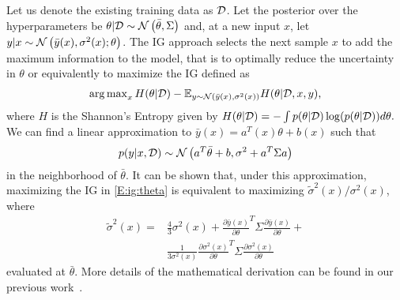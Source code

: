 Let us denote the existing training data as \(\mathcal{D}\).
Let the posterior over the hyperparameters be \(\theta|\mathcal{D} \sim \operatorname*{\mathcal{N}}\left(\bar{\theta}, \Sigma\right)\) and, at a new input $x$, let \(y|x \sim \operatorname*{\mathcal{N}}\left(\bar{y}(x), \sigma^2(x);\theta\right)\).
The IG approach selects the next sample $x$ to add the maximum information to the model, that is to optimally reduce the uncertainty in $\theta$ or equivalently to maximize the IG defined as
\begin{align}
\textstyle\operatorname*{arg\,max}_x H(\theta|\mathcal{D}) - \mathbb{E}_{y \sim \operatorname*{\mathcal{N}}\left(\bar{y}(x), \sigma^2(x)\right)}H(\theta|\mathcal{D},x,y)\text,
\label{E:ig:theta}
\end{align}
where \(H\) is the Shannon's Entropy given by
\begin{math}
H(\theta|\mathcal{D}) = -\int p(\theta|\mathcal{D}) \log (p(\theta|\mathcal{D}))d\theta \text.
\end{math}
We can find a linear approximation to \(\bar{y}(x) = a^T(x)\theta+b(x)\) such that
\begin{equation*}
p(y|x,\mathcal{D}) \sim \operatorname*{\mathcal{N}}\left(a^T\bar{\theta}+b, \sigma^2+a^T\Sigma a\right)
\end{equation*}
in the neighborhood of \(\bar{\theta}\).
It can be shown that, under this approximation, maximizing the IG in \eqref{E:ig:theta} is equivalent to maximizing \(\tilde{\sigma}^2(x)/{\sigma}^2(x)\), where
\begin{align*}
\tilde{\sigma}^2(x) = &\frac{4}{3}\sigma^2(x) + \frac{\partial \bar{y}(x)}{\partial \theta}^T \Sigma \frac{\partial \bar{y}(x)}{\partial \theta} + \nonumber \\
& \frac{1}{3\sigma^2(x)}\frac{\partial \sigma^2(x)}{\partial \theta}^T \Sigma \frac{\partial \sigma^2(x)}{\partial \theta}
\end{align*}
evaluated at \(\bar{\theta}\).
More details of the mathematical derivation can be found in our previous work~\cite{JainICCPS2018}.

